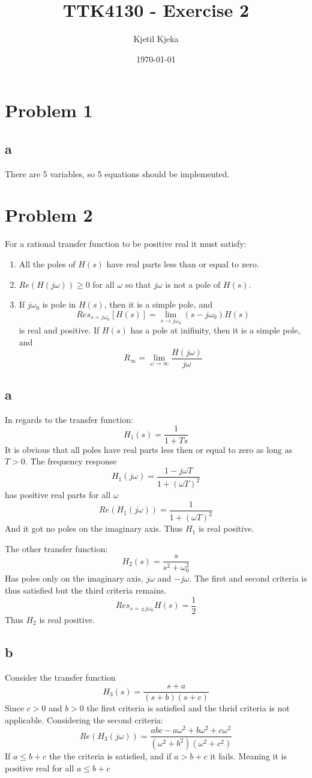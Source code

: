 \documentclass[11pt]{article}
\author{Kjetil Kjeka}
\title{TTK4130 - Exercise 2}
\date{\today}
\begin{document}
\maketitle
\section*{Problem 1}
\subsection*{a}
There are 5 variables, so 5 equations should be implemented.

\section*{Problem 2}
For a rational transfer function to be positive real it must satisfy:
\begin{enumerate}
\item All the poles of $H(s)$ have real parts less than or equal to zero.
\item $Re(H(j\omega)) \geq 0$ for all $\omega$ so that $j \omega$ is not a pole of $H(s)$.
\item If $j \omega_0$ is pole in $H(s)$, then it is a simple pole, and
\[Res_{s = j\omega_0} [H(s)] = \lim_{s \rightarrow j\omega_0} (s - j\omega_0)H(s)\]
is real and positive. If $H(s)$ has a pole at inifinity, then it is a simple pole, and
\[R_{\infty} = \lim_{\omega \rightarrow \infty} \frac{H(j\omega)}{j\omega}\]
\end{enumerate}

\subsection*{a}
In regards to the transfer function:
\[H_1(s) = \frac{1}{1+Ts}\]
It is obvious that all poles have real parts less then or equal to zero as long as $T > 0$. The frequency response
\[H_1(j\omega) = \frac{1 - j \omega T}{1 + (\omega T)^2}\]
has positive real parts for all $\omega$
\[Re(H_1(j \omega)) = \frac{1}{1 + (\omega T)^2}\]
And it got no poles on the imaginary axis. Thus $H_1$ is real positive.

The other transfer function:
\[H_2(s) = \frac{s}{s^2 + \omega^2_0}\]
Has poles only on the imaginary axis, $j\omega$ and $-j\omega$. The first and second criteria is thus satisfied but the third criteria remains.
\[Res_{s = \pm j \omega_0}H(s) = \frac{1}{2}\]
Thus $H_2$ is real positive.

\subsection*{b}
Consider the transfer function
\[H_3(s) = \frac{s + a}{(s + b)(s + c)} \]
Since $c > 0$ and $b > 0$ the first criteria is satisfied and the thrid criteria is not applicable. Considering the second criteria:
\[Re(H_3(j\omega)) = \frac{abc - a\omega^2 + b\omega^2 + c\omega^2 }{(\omega^2 + b^2)(\omega^2 + c^2)} \]
If $a \leq b + c$ the the criteria is satisfied, and if $a > b + c$ it fails. Meaning it is positive real for all $a \leq b + c$
\end{document}
